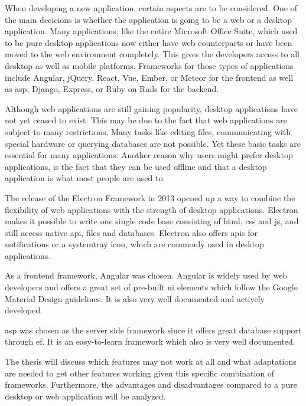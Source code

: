 
When developing a new application, certain aspects are to be considered. One of the main decicions is whether the application is going to be a web or a desktop application. Many applications, like the entire Microsoft Office Suite, which used to be pure desktop applications now either have web counterparts or have been moved to the web environment completely. This gives the developers access to all desktop as well as mobile platforms. Frameworks for those types of applications include Angular, jQuery, React, Vue, Ember, or Meteor for the frontend as well as \gls{asp}, Django, Express, or Ruby on Rails for the backend.

Although web applications are still gaining popularity, desktop applications have not yet ceased to exist. This may be due to the fact that web applications are subject to many restrictions. Many tasks like editing files, communicating with special hardware or querying databases are not possible. Yet these basic tasks are essential for many applications. Another reason why users might prefer desktop applications, is the fact that they can be used offline and that a desktop application is what most people are used to.

The release of the Electron Framework in 2013 opened up a way to combine the flexibility of web applications with the strength of desktop applications. Electron makes it possible to write one single code base consisting of \gls{html}, \gls{css} and \gls{js}, and still access native \gls{api}, files and databases. Electron also offers \gls{api}s for notifications or a systemtray icon, which are commonly used in desktop applications.

As a frontend framework, Angular was chosen. Angular is widely used by web developers and offers a great set of pre-built \gls{ui} elements which follow the Google Material Design guidelines. It is also very well documented and actively developed.

\gls{asp} was chosen as the server side framework since it offers great database support through \gls{ef}. It is an easy-to-learn framework which also is very well documented.

The thesis will discuss which features may not work at all and what adaptations are needed to get other features working given this specific combination of frameworks. Furthermore, the advantages and disadvantages compared to a pure desktop or web application will be analyzed.

